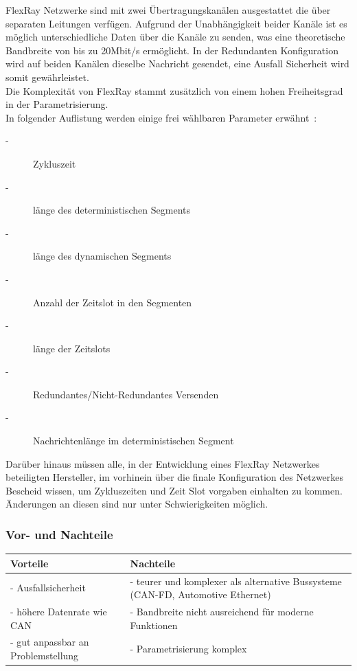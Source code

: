     FlexRay Netzwerke sind mit zwei Übertragungskanälen ausgestattet die über separaten Leitungen 
    verfügen. Aufgrund der Unabhängigkeit beider Kanäle ist es möglich unterschiedliche Daten über
    die Kanäle zu senden, was eine theoretische Bandbreite von bis zu 20Mbit/s ermöglicht. 
    In der Redundanten Konfiguration wird auf beiden Kanälen dieselbe Nachricht gesendet, eine 
    Ausfall Sicherheit wird somit gewährleistet.~\cite{LA_FR3}\\
    
    Die Komplexität von FlexRay stammt zusätzlich von einem hohen Freiheitsgrad in der
    Parametrisierung.\\
    In folgender Auflistung werden einige frei wählbaren Parameter erwähnt~\cite{LA_FR2}:
    \begin{description}
    \item[-] Zykluszeit
    \item[-] länge des deterministischen Segments
    \item[-] länge des dynamischen Segments
    \item[-] Anzahl der Zeitslot in den Segmenten
    \item[-] länge der Zeitslots
    \item[-] Redundantes/Nicht-Redundantes Versenden
    \item[-] Nachrichtenlänge im deterministischen Segment
    \end{description}

    Darüber hinaus müssen alle, in der Entwicklung eines FlexRay Netzwerkes beteiligten Hersteller, im 
    vorhinein über die finale Konfiguration des Netzwerkes Bescheid wissen, um Zykluszeiten und 
    Zeit Slot vorgaben einhalten zu kommen. Änderungen an diesen sind nur unter Schwierigkeiten möglich.


    \subsubsection{Vor- und Nachteile}
    \begin{center}
        \begin{tabular}{p{5.5cm} p{5.5cm}}
            \hline
            Vorteile & Nachteile\\
            \hline
            \hline - Ausfallsicherheit & - teurer und komplexer als alternative Bussysteme (CAN-FD, Automotive Ethernet)\\
            \hline - höhere Datenrate wie CAN &  - Bandbreite nicht ausreichend für moderne Funktionen\\
            \hline - gut anpassbar an Problemstellung & - Parametrisierung komplex\\
            \hline
        \end{tabular}            
    \end{center}

